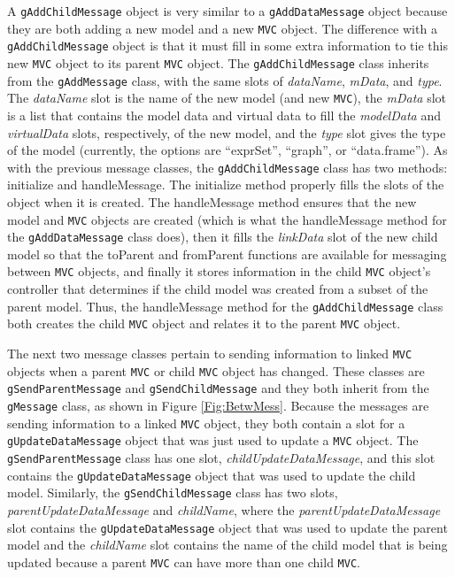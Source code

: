 \documentclass{article}[11pt]
\newcommand{\Rfunction}[1]{{\textsf{#1}}}
\newcommand{\Robject}[1]{{\texttt{#1}}}
\newcommand{\Rslot}[1]{\textsl{#1}}
\newcommand{\Rclass}[1]{\texttt{#1}}
\begin{document}
A \Robject{gAddChildMessage} object is very 
similar to a \Robject{gAddDataMessage} object because they are both adding a
new model and a new \Robject{MVC} object.  The difference with a
\Robject{gAddChildMessage} object is that it must fill in some extra
information to tie this new \Robject{MVC} object to its parent \Robject{MVC}
object.  The \Rclass{gAddChildMessage} class inherits from the
\Rclass{gAddMessage} class, with the same slots of \Rslot{dataName},
\Rslot{mData}, and \Rslot{type}.  The \Rslot{dataName} slot is the name of the
new model (and new \Robject{MVC}), the \Rslot{mData} slot is a list that
contains the model data and virtual data to fill the \Rslot{modelData} and
\Rslot{virtualData} slots, respectively, of the new model, and the
\Rslot{type} slot gives the type of the model (currently, the options are
``exprSet'', ``graph'', or ``data.frame'').  As with the previous
message classes, the \Rclass{gAddChildMessage} class has two methods:
\Rfunction{initialize} and \Rfunction{handleMessage}.  The
\Rfunction{initialize} method properly fills the slots of the object when it
is created.  The \Rfunction{handleMessage} method ensures that the new
model and \Robject{MVC} objects are created (which is what the
\Rfunction{handleMessage} method for the \Rclass{gAddDataMessage} class does),
then it fills the \Rslot{linkData} slot of the new child model
so that the \Rfunction{toParent} and \Rfunction{fromParent} functions are
available for messaging between \Robject{MVC} objects, and finally it stores
information in the child \Robject{MVC} object's controller that determines if
the child model was created from a subset of the parent
model.  Thus, the \Rfunction{handleMessage} method for the
\Rclass{gAddChildMessage} class both creates the child \Robject{MVC} object
and relates it to the parent \Robject{MVC} object. 

The next two message classes pertain to sending information to linked
\Robject{MVC} objects when a parent \Robject{MVC} or child \Robject{MVC}
object has changed.  These classes are \Rclass{gSendParentMessage} and
\Rclass{gSendChildMessage} and they both inherit from the \Rclass{gMessage}
class, as shown in Figure \ref{Fig:BetwMess}.  Because the messages are
sending information to a linked \Robject{MVC} object, they both contain a slot
for a \Robject{gUpdateDataMessage} object that was just used to update a
\Robject{MVC} object.  The \Rclass{gSendParentMessage} class has one slot,
\Rslot{childUpdateDataMessage}, and this slot contains the
\Robject{gUpdateDataMessage} object that was used to update the child
model.  Similarly, the \Rclass{gSendChildMessage} class has two
slots, \Rslot{parentUpdateDataMessage} and \Rslot{childName}, where the
\Rslot{parentUpdateDataMessage} slot contains the \Robject{gUpdateDataMessage}
object that was used to update the parent model and the
\Rslot{childName} slot contains the name of the child model that is
being updated because a parent \Robject{MVC} can have more than one child
\Robject{MVC}.  
\end{document}
